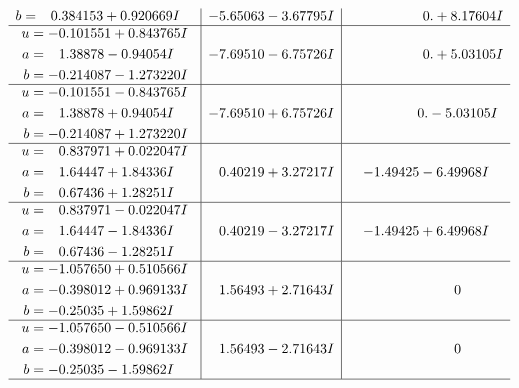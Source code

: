 \documentclass[1p]{elsarticle_modified}
\theoremstyle{definition}
\begin{document}
$$\begin{array}{c|c|c}
\begin{aligned}
b &= \phantom{-}0.384153 + 0.920669 I\end{aligned}
 & -5.65063 - 3.67795 I & \phantom{-0.000000 -}0. + 8.17604 I \\ \hline\begin{aligned}
u &= -0.101551 + 0.843765 I \\
a &= \phantom{-}1.38878 - 0.94054 I \\
b &= -0.214087 - 1.273220 I\end{aligned}
 & -7.69510 - 6.75726 I & \phantom{-0.000000 -}0. + 5.03105 I \\ \hline\begin{aligned}
u &= -0.101551 - 0.843765 I \\
a &= \phantom{-}1.38878 + 0.94054 I \\
b &= -0.214087 + 1.273220 I\end{aligned}
 & -7.69510 + 6.75726 I & \phantom{-0.000000 } 0. - 5.03105 I \\ \hline\begin{aligned}
u &= \phantom{-}0.837971 + 0.022047 I \\
a &= \phantom{-}1.64447 + 1.84336 I \\
b &= \phantom{-}0.67436 + 1.28251 I\end{aligned}
 & \phantom{-}0.40219 + 3.27217 I & -1.49425 - 6.49968 I \\ \hline\begin{aligned}
u &= \phantom{-}0.837971 - 0.022047 I \\
a &= \phantom{-}1.64447 - 1.84336 I \\
b &= \phantom{-}0.67436 - 1.28251 I\end{aligned}
 & \phantom{-}0.40219 - 3.27217 I & -1.49425 + 6.49968 I \\ \hline\begin{aligned}
u &= -1.057650 + 0.510566 I \\
a &= -0.398012 + 0.969133 I \\
b &= -0.25035 + 1.59862 I\end{aligned}
 & \phantom{-}1.56493 + 2.71643 I & \phantom{-0.000000 } 0 \\ \hline\begin{aligned}
u &= -1.057650 - 0.510566 I \\
a &= -0.398012 - 0.969133 I \\
b &= -0.25035 - 1.59862 I\end{aligned}
 & \phantom{-}1.56493 - 2.71643 I & \phantom{-0.000000 } 0\\
 \hline 
 \end{array}$$\newpage$$\begin{array}{c|c|c}  

\end{array}$$
\end{document}

